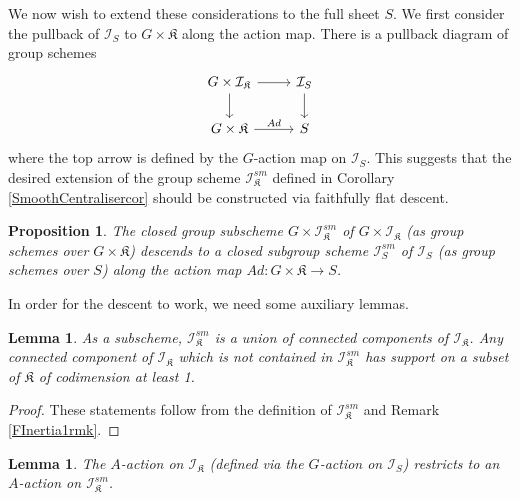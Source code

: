 \documentclass{amsart}
\newtheorem{lemma}[theorem]{Lemma}
\newtheorem{proposition}[theorem]{Proposition}
\theoremstyle{remark}
\numberwithin{theorem}{section}
\numberwithin{equation}{section}
\begin{document}
We now wish to extend these considerations to the full sheet $S$. We first consider the pullback of $\mathcal I_S$ to $G \times \mathfrak{K}$ along the action map. There is a pullback diagram of group schemes
\begin{equation}\label{CentraliserPullbackeqn}
\begin{tikzcd}
G \times \mathcal I_{\mathfrak{K}} \arrow[r] \arrow[d] & \mathcal I_S \arrow[d] \\
G \times \mathfrak{K} \arrow[r, "Ad"]                  & S                     
\end{tikzcd}
\end{equation}
where the top arrow is defined by the $G$-action map on $\mathcal I_S$. This suggests that the desired extension of the group scheme $\mathcal I^{sm}_{\mathfrak{K}}$ defined in Corollary \ref{SmoothCentralisercor} should be constructed via faithfully flat descent. 

\begin{proposition}\label{SmCentraliserDescentprp}
    The closed group subscheme $G\times \mathcal I_{\mathfrak{K}}^{sm}$ of $G \times \mathcal I_{\mathfrak{K}}$ (as group schemes over $G\times \mathfrak{K}$) descends to a closed subgroup scheme $\mathcal I_S^{sm}$ of $\mathcal I_S$ (as group schemes over $S$) along the action map $Ad:G \times \mathfrak{K} \rightarrow S$.
\end{proposition}

In order for the descent to work, we need some auxiliary lemmas.

\begin{lemma}\label{CentraliserCompslem}
    As a subscheme, $\mathcal I_{\mathfrak{K}}^{sm}$ is a union of connected components of $\mathcal I_{\mathfrak{K}}$. Any connected component of $\mathcal I_{\mathfrak{K}}$ which is not contained in $\mathcal I_{\mathfrak{K}}^{sm}$ has support on a subset of $\mathfrak{K}$ of codimension at least 1.
\end{lemma}

\begin{proof}
These statements follow from the definition of $\mathcal I_{\mathfrak{K}}^{sm}$ and Remark \ref{FInertia1rmk}.
\end{proof}

\begin{lemma}\label{RedCentSCActionlem}
    The $A$-action on $\mathcal I_{\mathfrak{K}}$ (defined via the $G$-action on $\mathcal I_S$) restricts to an $A$-action on $\mathcal I_{\mathfrak{K}}^{sm}$.
\end{lemma}
\end{document}
